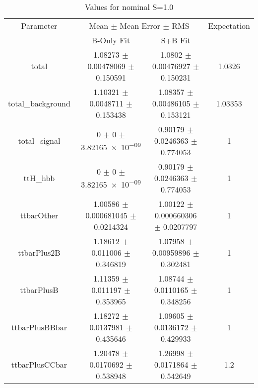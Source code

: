\begin{table}
\centering
\caption{Values for nominal S=1.0}
\begin{tabular}{cccc}
\toprule
Parameter & \multicolumn{2}{c}{Mean $\pm$ Mean Error $\pm$ RMS} & Expectation\\
 & B-Only Fit & S+B Fit & \\
\midrule
total & \num{1.08273} $\pm$ \num{0.00478069} $\pm$ \num{0.150591} & \num{1.0802} $\pm$ \num{0.00476927} $\pm$ \num{0.150231} & \num{1.0326}\\
total\_background & \num{1.10321} $\pm$ \num{0.0048711} $\pm$ \num{0.153438} & \num{1.08357} $\pm$ \num{0.00486105} $\pm$ \num{0.153121} & \num{1.03353}\\
total\_signal & \num{0} $\pm$ \num{0} $\pm$ \num{3.82165e-09} & \num{0.90179} $\pm$ \num{0.0246363} $\pm$ \num{0.774053} & \num{1}\\
ttH\_hbb & \num{0} $\pm$ \num{0} $\pm$ \num{3.82165e-09} & \num{0.90179} $\pm$ \num{0.0246363} $\pm$ \num{0.774053} & \num{1}\\
ttbarOther & \num{1.00586} $\pm$ \num{0.000681045} $\pm$ \num{0.0214324} & \num{1.00122} $\pm$ \num{0.000660306} $\pm$ \num{0.0207797} & \num{1}\\
ttbarPlus2B & \num{1.18612} $\pm$ \num{0.011006} $\pm$ \num{0.346819} & \num{1.07958} $\pm$ \num{0.00959896} $\pm$ \num{0.302481} & \num{1}\\
ttbarPlusB & \num{1.11359} $\pm$ \num{0.011197} $\pm$ \num{0.353965} & \num{1.08744} $\pm$ \num{0.0110165} $\pm$ \num{0.348256} & \num{1}\\
ttbarPlusBBbar & \num{1.18272} $\pm$ \num{0.0137981} $\pm$ \num{0.435646} & \num{1.09605} $\pm$ \num{0.0136172} $\pm$ \num{0.429933} & \num{1}\\
ttbarPlusCCbar & \num{1.20478} $\pm$ \num{0.0170692} $\pm$ \num{0.538948} & \num{1.26998} $\pm$ \num{0.0171864} $\pm$ \num{0.542649} & \num{1.2}\\
\bottomrule
\end{tabular}
\end{table}